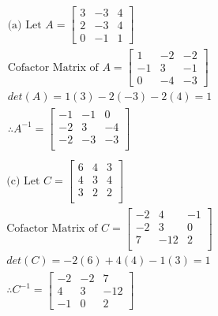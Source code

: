 \documentclass[12pt, a4paper]{article}
\begin{document}
\begin{gather*}
  \text{(a) Let } A = 
  \left[ \begin{array}{ccc}
    3 & -3 & 4 \\
    2 & -3 & 4 \\
    0 & -1 & 1
  \end{array} \right] \\[5pt]
  \text{Cofactor Matrix of } A = 
  \left[ \begin{array}{ccc}
    1 & -2 & -2 \\ 
    -1 & 3 & -1 \\
    0 & -4 & -3
  \end{array} \right] \\[5pt]
  det(A) = 1(3) -2(-3) -2(4) = 1 \\[5pt]
  \therefore A^{-1} = 
  \left[ \begin{array}{ccc}
    -1 & -1 & 0 \\
    -2 & 3 & -4 \\
    -2 & -3 & -3 \\
  \end{array} \right] \\[5pt]
\end{gather*}
\begin{gather*}
  \text{(c) Let } C = 
  \left[ \begin{array}{ccc}
    6 & 4 & 3 \\
    4 & 3 & 4 \\
    3 & 2 & 2 \\
  \end{array} \right] \\[5pt]
  \text{Cofactor Matrix of } C= 
  \left[ \begin{array}{ccc}
    -2 & 4 & -1 \\
    -2 & 3 & 0 \\
    7 & -12 & 2 \\
  \end{array} \right] \\[5pt]
  det(C) = -2(6) + 4(4) - 1(3) = 1 \\[5pt]
  \therefore C^{-1} = 
  \left[ \begin{array}{ccc}
    -2 & -2 & 7 \\
    4 & 3 & -12 \\
    -1 & 0 & 2
  \end{array} \right]
\end{gather*}
\end{document}
